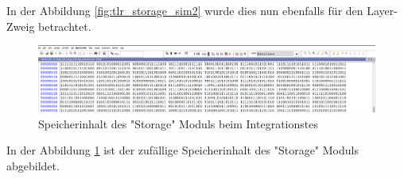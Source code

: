 \documentclass{article}
\numberwithin{equation}{section}
\begin{document}
\FloatBarrier
In der Abbildung \ref{fig:tlr_storage_sim2} wurde dies nun ebenfalls für den Layer-Zweig
betrachtet.
\begin{figure}[htb!]
    \begin{center}
      \includegraphics[width=15cm]{SimulationPictures/storage_memory_data_sim.png}
    \end{center}
    \caption{Speicherinhalt des "Storage" Moduls beim Integrationstes} \label{fig:storage_content}
  \end{figure}
\FloatBarrier
In der Abbildung \ref{fig:storage_content} ist der zufällige Speicherinhalt des "Storage"
Moduls abgebildet.
\pagebreak
\end{document}
